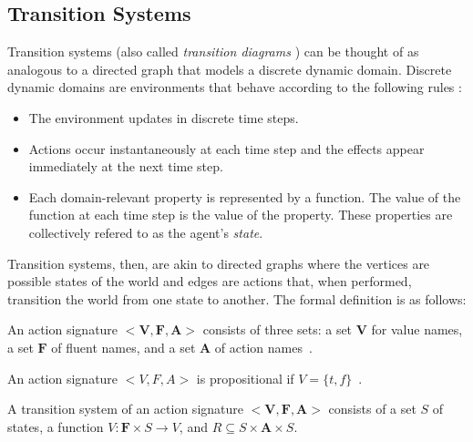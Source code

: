 \subsection{Transition Systems}
\label{subsec:transition_systems}

Transition systems (also called \textit{transition diagrams} \cite{blount_architecture_2013}) can be thought of as analogous to a directed graph that models a discrete dynamic domain.
Discrete dynamic domains are environments that behave according to the following rules \cite{blount_architecture_2013}:

\begin{itemize}
    \item The environment updates in discrete time steps.
    \item Actions occur instantaneously at each time step and the effects appear immediately at the next time step.
    \item Each domain-relevant property is represented by a function.
        The value of the function at each time step is the value of the property.
        These properties are collectively refered to as the agent's \textit{state}.
\end{itemize}

Transition systems, then, are akin to directed graphs where the vertices are possible states of the world and edges are actions that, when performed, transition the world from one state to another.
The formal definition is as follows:

\begin{definition}
    An action signature $ < \boldsymbol{V}, \boldsymbol{F}, \boldsymbol{A}> $ consists of three sets: a set $ \boldsymbol{V} $ for value names, a set $ \boldsymbol{F} $ of fluent names, and a set $ \boldsymbol{A} $ of action names~\cite{gelfond_action_1998}.
\end{definition}

\begin{definition}
    An action signature $< V,F,A >$ is propositional if $V=\{t,f\}$~\cite{gelfond_action_1998}.
\end{definition}

\begin{definition}
    A transition system of an action signature $ < \boldsymbol{V}, \boldsymbol{F}, \boldsymbol{A}> $ consists of a set $ S $ of states, a function $ V : \boldsymbol{F} \times S\rightarrow V $, and $ R \subseteq S \times \boldsymbol{A} \times S $.
\end{definition}

